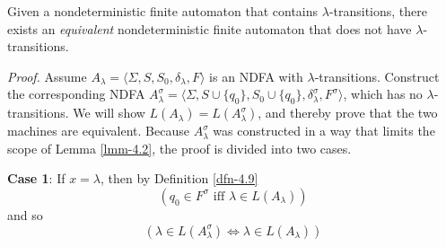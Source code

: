 \begin{thm}\label{thm-4.2}
Given a nondeterministic finite automaton that contains $\lambda$-transitions,
there exists an \emph{equivalent} nondeterministic finite automaton that does
not have $\lambda$-transitions.

\emph{Proof.} Assume $A_{\lambda}=\langle\Sigma,S,S_0,\delta_{\lambda},F\rangle$
is an NDFA with $\lambda$-transitions. Construct the corresponding NDFA
$A^{\sigma}_{\lambda} = \langle\Sigma,S\cup\{q_0\},S_0\cup\{q_0\},
\delta^{\sigma}_{\lambda},F^{\sigma}\rangle$, which has no $\lambda$-transitions.
We will show $L(A_{\lambda})=L(A^{\sigma}_{\lambda})$, and thereby prove that the
two machines are equivalent. Because $A^{\sigma}_{\lambda}$ was constructed in a way that
limits the scope of Lemma \ref{lmm-4.2}, the proof is divided into two cases.

\textbf{Case 1}: If $x = \lambda$, then by Definition \ref{dfn-4.9}
\[ (q_0 \in F^{\sigma}\text{ iff }\lambda \in L (A_{\lambda})) \]
and so
\[ (\lambda \in L(A^{\sigma}_{\lambda}) \Leftrightarrow \lambda \in
	L(A_{\lambda})) \]


\end{thm}
